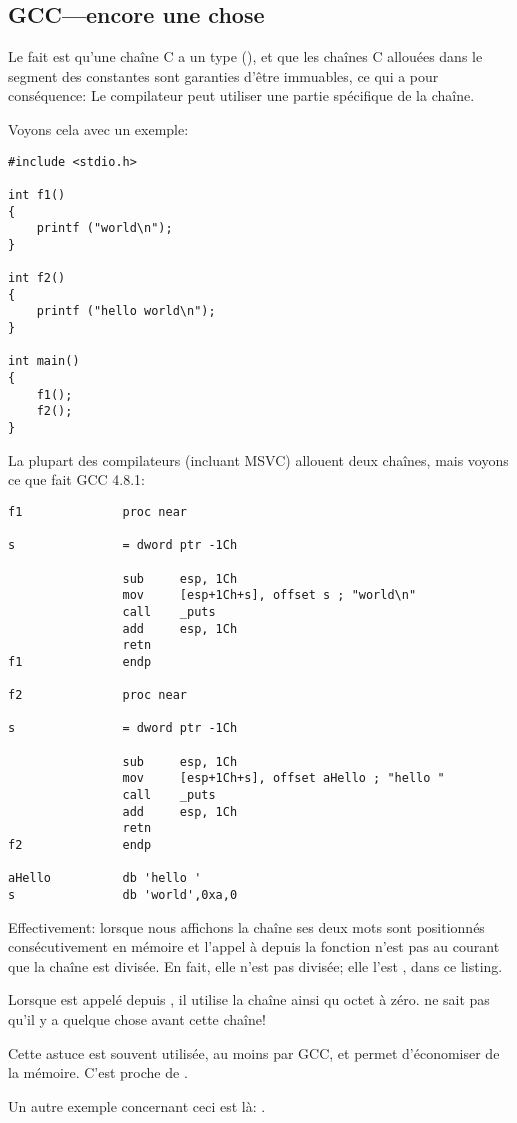 ﻿\subsection{GCC---encore une chose}
\label{use_parts_of_C_strings}

Le fait est qu'une chaîne C  a un type  (),
et que les chaînes C allouées dans le segment des constantes sont garanties d'être immuables, ce qui a pour
conséquence:
Le compilateur peut utiliser une partie spécifique de la chaîne.

Voyons cela avec un exemple:

\begin{lstlisting}[style=customc]
#include <stdio.h>

int f1()
{
	printf ("world\n");
}

int f2()
{
	printf ("hello world\n");
}

int main()
{
	f1();
	f2();
}
\end{lstlisting}

La plupart des compilateurs \CCpp{} (incluant MSVC) allouent deux chaînes, mais voyons ce que fait GCC 4.8.1:

\begin{lstlisting}[caption=GCC 4.8.1 + IDA listing,style=customasmx86]
f1              proc near

s               = dword ptr -1Ch

                sub     esp, 1Ch
                mov     [esp+1Ch+s], offset s ; "world\n"
                call    _puts
                add     esp, 1Ch
                retn
f1              endp

f2              proc near

s               = dword ptr -1Ch

                sub     esp, 1Ch
                mov     [esp+1Ch+s], offset aHello ; "hello "
                call    _puts
                add     esp, 1Ch
                retn
f2              endp

aHello          db 'hello '
s               db 'world',0xa,0
\end{lstlisting}

Effectivement: lorsque nous affichons la chaîne  ses deux mots sont positionnés
consécutivement en mémoire et l'appel à \puts depuis la fonction 
n'est pas au courant que la chaîne est divisée.
En fait, elle n'est pas divisée; elle l'est , dans ce listing.

Lorsque \puts est appelé depuis , il utilise la chaîne  ainsi qu octet à zéro. \puts ne sait pas
qu'il y a quelque chose avant cette chaîne!

Cette astuce est souvent utilisée, au moins par GCC, et permet d'économiser de la mémoire.
C'est proche de . %

Un autre exemple concernant ceci est là: .

